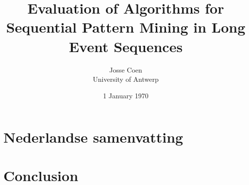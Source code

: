 \documentclass{scrartcl}
\theoremstyle{definition}
\begin{document}
\frenchspacing

\title{Evaluation of Algorithms for Sequential Pattern Mining in Long Event Sequences}
\subtitle{}

\author{Josse Coen
\vspace{.3cm}\\
%
University of Antwerp
%
}

\date{1 January 1970}

\maketitle




\section{Nederlandse samenvatting}

\newpage


\newpage


\newpage





\section{Conclusion}
\end{document}
